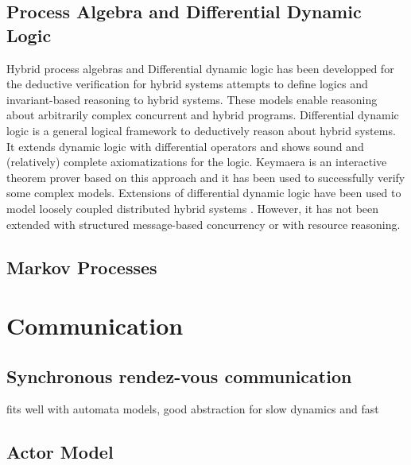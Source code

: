 \documentclass[
graybox,
envcountchap
]{svmult}
\begin{document}
\begin{bibunit}
    \subsection{Process Algebra and Differential Dynamic Logic}

Hybrid process algebras \cite{RoundsS03,BERGSTRA2005215,10.1007/978-3-319-53733-7_8,DBLP:conf/case/CampbellTLPOF16} and Differential dynamic logic \cite{PlatzerBook,Platzer18,PlatzerT18} has been developped for the deductive verification for hybrid systems attempts to define logics and invariant-based reasoning to hybrid systems.
These models enable reasoning about arbitrarily complex concurrent and hybrid programs.
Differential dynamic logic is a general logical framework to deductively reason about hybrid systems.
It extends dynamic logic with differential operators and shows sound and (relatively) complete axiomatizations for the logic.
Keymaera \cite{QueselMLAP16} is an interactive theorem prover based on this approach and it has been used to successfully verify some complex models.
Extensions of differential dynamic logic have been used to model loosely coupled distributed hybrid systems \cite{Platzer12}.
However, it has not been extended with structured message-based concurrency or with resource reasoning.


    \subsection{Markov Processes}


\section{Communication} %

    \subsection{Synchronous rendez-vous communication}

    fits well with automata models, good abstraction for slow dynamics and fast

    \subsection{Actor Model}


\end{bibunit}
\end{document}
